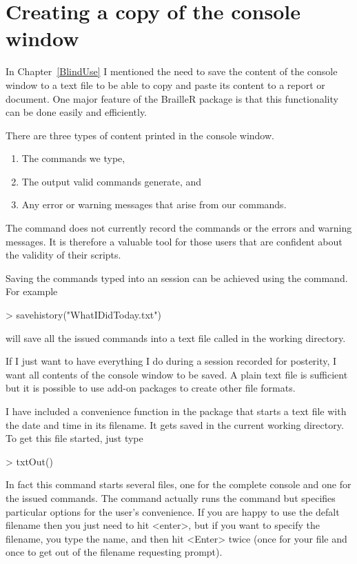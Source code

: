  
\section{Creating a copy of the \R{} console window}\label{CreateCopyConsole} 
 
In Chapter~\ref{BlindUse} I mentioned the need to save the content of the console window to a text file to be able to copy and paste its content to a report or document. One major feature of the BrailleR package is that this functionality can be done easily and efficiently. 
 
There are three types of content printed in the console window.\begin{enumerate} 
\item The commands we type, 
\item The output valid commands generate, and 
\item Any error or warning messages that arise from our commands. 
\end{enumerate} 
 
The  command does not currently record the commands or the errors and warning messages. It is therefore a valuable tool for those \R{} users that are confident about the validity of their scripts. 
 
Saving the commands typed into an \R{} session can be achieved using the  command. For example 
\begin{Schunk}
\begin{Sinput}
> savehistory("WhatIDidToday.txt") 
\end{Sinput}
\end{Schunk}
will save all the issued commands into a text file called  in the working directory.  
 
If I just want to have everything I do during a session recorded for posterity, I want all contents of the console window to be saved. A plain text file is sufficient but it is possible to use add-on packages to create other file formats. 
 
I have included a convenience function in the  package that starts a text file with the date and time in its filename. It gets saved in the current working directory. To get this file started, just type 
\begin{Schunk}
\begin{Sinput}
> txtOut() 
\end{Sinput}
\end{Schunk}
In fact this command starts several files, one for the complete console and one for the issued commands. The command actually runs the  command but specifies particular options for the user's convenience. If you are happy to use the defalt filename then you just need to hit <enter>, but if you want to specify the filename, you type the name, and then hit <Enter> twice (once for your file and once to get out of the filename requesting prompt). 
 
